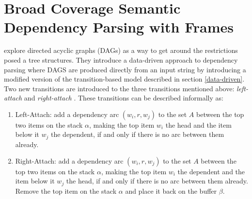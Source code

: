 \chapter{Broad Coverage Semantic Dependency Parsing with Frames}
\label{chap:parsing}

\citeauthor{Sagae:Tsuji:08} explore directed acyclic graphs (DAGs) as a way to get around the restrictions posed a tree structures. They introduce a data-driven approach to dependency parsing where DAGS are produced directly from an input string by introducing a modified version of the transition-based model described in section \ref{data-driven}. Two new transitions are introduced to the three transitions mentioned above: \textit{left-attach} and \textit{right-attach} \cite{Sagae:Tsuji:08}. These transitions can be described informally as:

\begin{enumerate}
\item Left-Attach: add a dependency arc $(w_i, r, w_j)$ to the set $A$ between the top two items on the stack $\alpha$, making the top item $w_i$ the head and the item below it $w_j$ the dependent, if and only if there is no arc between them already.
\item Right-Attach: add a dependency arc $(w_i, r, w_j)$ to the set $A$ between the top two items on the stack $\alpha$, making the top item $w_i$ the dependent and the item below it $w_j$ the head, if and only if there is no arc between them already. Remove the top item on the stack $\alpha$ and place it back on the buffer $\beta$.
\end{enumerate}

